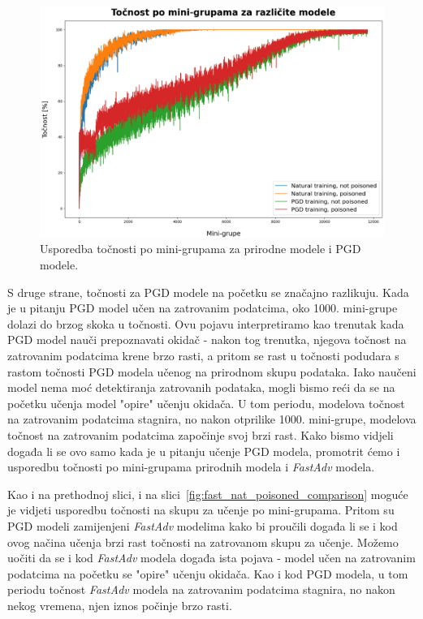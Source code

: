 \documentclass[times, utf8, zavrsni, numeric]{fer}
\begin{document}
\pagebreak

\begin{figure}[htb]
    \centering
    \includegraphics[scale=0.41]{../stats/train_accuracy_comparison_nat_pgd.png}
    \caption{Usporedba točnosti po mini-grupama za prirodne modele i PGD modele.}
    \label{fig:pgd_nat_poisoned_comparison}
\end{figure}

S druge strane, točnosti za PGD modele na početku se značajno razlikuju. 
Kada je u pitanju PGD model učen na zatrovanim podatcima, oko 1000. mini-grupe dolazi do brzog skoka u točnosti.
Ovu pojavu interpretiramo kao trenutak kada PGD model nauči prepoznavati okidač - nakon tog trenutka, njegova točnost na zatrovanim podatcima krene brzo rasti, 
a pritom se rast u točnosti podudara s rastom točnosti PGD modela učenog na prirodnom skupu podataka.
Iako naučeni model nema moć detektiranja zatrovanih podataka, mogli bismo reći da se na početku učenja model "opire" učenju okidača.
U tom periodu, modelova točnost na zatrovanim podatcima stagnira, no nakon otprilike 1000. mini-grupe, modelova točnost na zatrovanim podatcima započinje svoj brzi rast. 
Kako bismo vidjeli događa li se ovo samo kada je u pitanju učenje PGD modela, promotrit ćemo i usporedbu točnosti po mini-grupama prirodnih modela i \textit{FastAdv} modela.

Kao i na prethodnoj slici, i na slici~\ref{fig:fast_nat_poisoned_comparison} moguće je vidjeti usporedbu točnosti na skupu za učenje po mini-grupama.
Pritom su PGD modeli zamijenjeni \textit{FastAdv} modelima kako bi proučili događa li se i kod ovog načina učenja brzi rast točnosti na zatrovanom skupu za učenje.
Možemo uočiti da se i kod \textit{FastAdv} modela događa ista pojava - model učen na zatrovanim podatcima na početku se "opire" učenju okidača.
Kao i kod PGD modela, u tom periodu točnost \textit{FastAdv} modela na zatrovanim podatcima stagnira, no nakon nekog vremena, njen iznos počinje brzo rasti.
\end{document}
